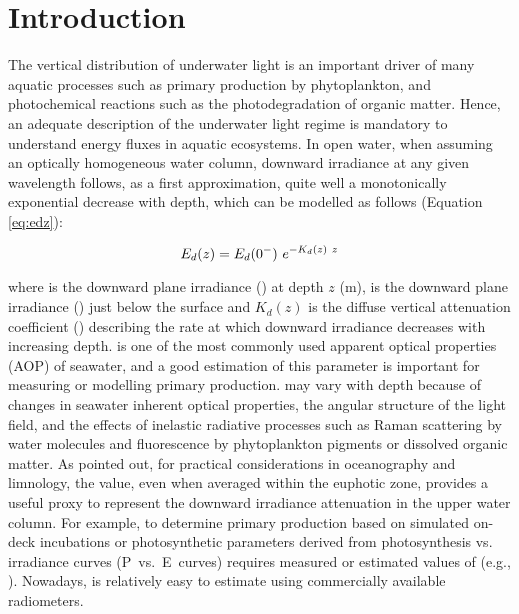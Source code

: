 \section{Introduction}

The vertical distribution of underwater light is an important driver of many aquatic processes such as primary production by phytoplankton, and photochemical reactions such as the photodegradation of organic matter. Hence, an adequate description of the underwater light regime is mandatory to understand energy fluxes in aquatic ecosystems. In open water, when assuming an optically homogeneous water column, downward irradiance at any given wavelength follows, as a first approximation, quite well a monotonically exponential decrease with depth, which can be modelled as follows \citep{Kirk1994} (Equation \ref{eq:edz}):

\begin{equation}
    {E_d(z)}{} = {E_d(0^-)}{}~e^{-K_{d}(z)~z}
    \label{eq:edz}
\end{equation}

\noindent where \edz{} is the downward plane irradiance (\wmsquare{}) at depth $z$ (m), \edzero{} is the downward plane irradiance (\wmsquare{}) just below the surface and $K_d(z)$ is the diffuse vertical attenuation coefficient (\mminus{}) describing the rate at which downward irradiance decreases with increasing depth. \ked{} is one of the most commonly used apparent optical properties (AOP) of seawater, and a good estimation of this parameter is important for measuring or modelling primary production. \ked{} may vary with depth because of changes in seawater inherent optical properties, the angular structure of the light field, and the effects of inelastic radiative processes such as Raman scattering by water molecules and fluorescence by phytoplankton pigments or dissolved organic matter. As \citet{Kirk1994} pointed out, for practical considerations in oceanography and limnology, the \ked{} value, even when averaged within the euphotic zone, provides a useful proxy to represent the downward irradiance attenuation in the upper water column. For example, to determine primary production based on simulated on-deck incubations or photosynthetic parameters derived from photosynthesis vs. irradiance curves (P~vs.~E~curves) requires measured or estimated values of \ked{} (e.g., \citet{Morel1996}). Nowadays, \ked{} is relatively easy to estimate using commercially available radiometers.

